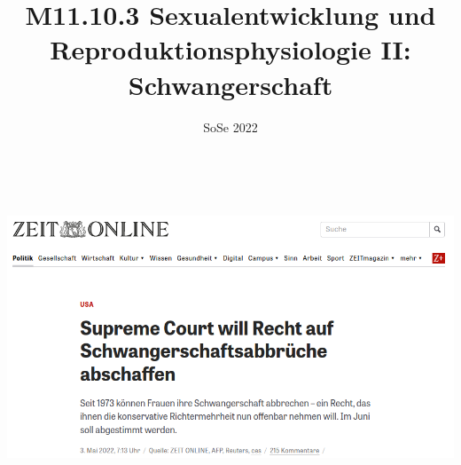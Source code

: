 \documentclass{beamer}
\title[M11.10.3 Schwangerschaft]{M11.10.3 Sexualentwicklung und Reproduktionsphysiologie II: Schwangerschaft}
\author[melanie.stefan@medicalschool-berlin.de]{}
\institute[]{Prof. Melanie Stefan - melanie.stefan@medcialschool-berlin.de}
\date{SoSe 2022}
\begin{document}
{
\begin{frame}

 \maketitle 

$\,$\\[6cm]


\end{frame} 
}




\begin{frame}

\begin{center}
\includegraphics[width=\textwidth]{supreme_court_abtreibung.png}
\end{center}

\end{frame} 



\end{document}
